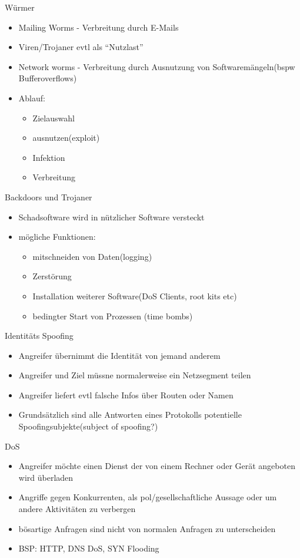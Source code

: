 \documentclass{article} %
\begin{document}
Würmer
\begin{itemize}
	\item Mailing Worms - Verbreitung durch E-Mails
    \item Viren/Trojaner evtl als "`Nutzlast"'
    \item Network worms - Verbreitung durch Ausnutzung von Softwaremängeln(bspw Bufferoverflows)
    \item Ablauf:
    
    \begin{itemize}
        \item Zielauswahl
        \item ausnutzen(exploit)
        \item Infektion
        \item Verbreitung
    \end{itemize}
\end{itemize}
Backdoors und Trojaner
\begin{itemize}
	\item Schadsoftware wird in nützlicher Software versteckt
    \item mögliche Funktionen:
    
    \begin{itemize}
        \item mitschneiden von Daten(logging)
        \item Zerstörung
        \item Installation weiterer Software(DoS Clients, root kits etc)
        \item bedingter Start von Prozessen (time bombs)
    \end{itemize}
\end{itemize}
Identitäts Spoofing
\begin{itemize}
	\item Angreifer übernimmt die Identität von jemand anderem 
    \item Angreifer und Ziel müssne normalerweise ein Netzsegment teilen
    \item Angreifer liefert evtl falsche Infos über Routen oder Namen
    \item Grundsätzlich sind alle Antworten eines Protokolls potentielle Spoofingsubjekte(subject of spoofing?)
\end{itemize}
DoS
\begin{itemize}
	\item Angreifer möchte einen Dienst der von einem Rechner oder Gerät angeboten wird überladen
    \item Angriffe gegen Konkurrenten, als pol/gesellschaftliche Aussage oder um andere Aktivitäten zu verbergen
    \item bösartige Anfragen sind nicht von normalen Anfragen zu unterscheiden
    \item BSP: HTTP, DNS DoS, SYN Flooding
\end{itemize}
\end{document}
